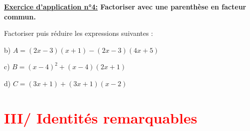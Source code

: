 \documentclass[12pt]{article}
\begin{document}
\vspace{10pt}
\begin{mdframed}[
    linewidth=1pt,
    roundcorner=5pt,
    linecolor=RoyalBlue,
    innertopmargin=10pt,
    innerbottommargin=10pt
]
{\color{RoyalBlue}
\textbf{\underline{Exercice d'application n°4:} Factoriser avec une parenthèse en facteur commun.}}

\vspace{5pt}
Factoriser puis réduire les expressions suivantes :

\vspace{5pt}
\hspace{1cm}b) $A = (2x-3)(x+1) - (2x-3)(4x+5)$

\vspace{5pt}
\hspace{1cm}c) $B = (x-4)^2 + (x-4)(2x+1)$

\vspace{5pt}
\hspace{1cm}d) $C = (3x+1) + (3x+1)(x-2)$

\vspace{0.5cm}
{\color{black!45}\dotfill}

\vspace{0.5cm}
{\color{black!45}\dotfill}

\vspace{0.5cm}
{\color{black!45}\dotfill}

\vspace{0.5cm}
{\color{black!45}\dotfill}

\vspace{0.5cm}
{\color{black!45}\dotfill}

\vspace{0.5cm}
{\color{black!45}\dotfill}

\vspace{0.5cm}
{\color{black!45}\dotfill}

\vspace{0.5cm}
{\color{black!45}\dotfill}

\vspace{20pt}

\end{mdframed}


\section*{\textcolor{red}{III/ Identités remarquables}}
\end{document}
